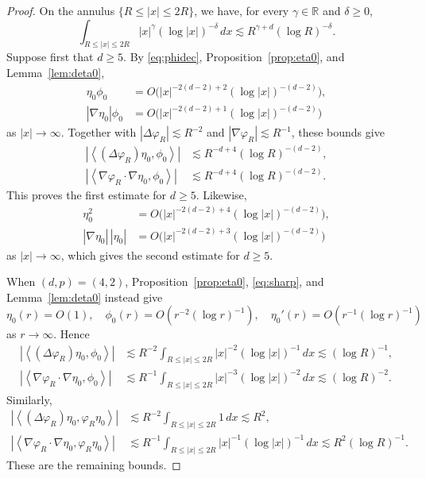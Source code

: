 \documentclass[12pt, a4paper, reqno]{amsart}
\numberwithin{equation}{section}
\theoremstyle{definition}
\theoremstyle{remark}
\newcommand{\R}{\mathbb R}
\def\tbra[#1,#2]{{\left\langle #1,#2\right\rangle}}
\def\abs[#1]{{\left\vert #1 \right\vert}}
\begin{document}
\begin{proof}
On the annulus $\{R\le|x|\le2R\}$, we have, for every
$\gamma\in\R$ and $\delta\ge0$,
\[
  \int_{R\le|x|\le2R}
  |x|^\gamma(\log|x|)^{-\delta}\,dx
  \lesssim R^{\gamma+d}(\log R)^{-\delta}.
\]
Suppose first that $d\ge5$. By \eqref{eq:phidec},
Proposition~\ref{prop:eta0}, and Lemma~\ref{lem:deta0},
\begin{align*}
  \eta_0\phi_0
  &=O\bigl(|x|^{-2(d-2)+2}(\log|x|)^{-(d-2)}\bigr),
  \\
  |\nabla\eta_0|\phi_0
  &=O\bigl(|x|^{-2(d-2)+1}(\log|x|)^{-(d-2)}\bigr)
\end{align*}
as $|x|\to\infty$. Together with
$|\Delta\varphi_R|\lesssim R^{-2}$ and
$|\nabla\varphi_R|\lesssim R^{-1}$, these bounds give
\begin{align*}
  \abs[{\tbra[(\Delta\varphi_R)\eta_0,\phi_0]}]
  &\lesssim R^{-d+4}(\log R)^{-(d-2)},
  \\
  \abs[{\tbra[\nabla\varphi_R\cdot\nabla\eta_0,\phi_0]}]
  &\lesssim R^{-d+4}(\log R)^{-(d-2)}.
\end{align*}
This proves the first estimate for $d\ge5$. Likewise,
\begin{align*}
  \eta_0^2
  &=O\bigl(|x|^{-2(d-2)+4}(\log|x|)^{-(d-2)}\bigr),
  \\
  |\nabla\eta_0|\,|\eta_0|
  &=O\bigl(|x|^{-2(d-2)+3}(\log|x|)^{-(d-2)}\bigr)
\end{align*}
as $|x|\to\infty$, which gives the second estimate for $d\ge5$.

When $(d,p)=(4,2)$, Proposition~\ref{prop:eta0},
\eqref{eq:sharp}, and Lemma~\ref{lem:deta0} instead give
\[
  \eta_0(r)=O(1),\quad
  \phi_0(r)=O(r^{-2}(\log r)^{-1}),\quad
  \eta_0'(r)=O(r^{-1}(\log r)^{-1})
\]
as $r\to\infty$. Hence
\begin{align*}
  \abs[{\tbra[(\Delta\varphi_R)\eta_0,\phi_0]}]
  &\lesssim R^{-2}
       \int_{R\le|x|\le2R}|x|^{-2}(\log|x|)^{-1}\,dx
       \lesssim(\log R)^{-1},\\
  \abs[{\tbra[\nabla\varphi_R\cdot\nabla\eta_0,\phi_0]}]
  &\lesssim R^{-1}
       \int_{R\le|x|\le2R}|x|^{-3}(\log|x|)^{-2}\,dx
       \lesssim(\log R)^{-2}.
\end{align*}
Similarly,
\begin{align*}
  \abs[{\tbra[(\Delta\varphi_R)\eta_0,\varphi_R\eta_0]}]
  &\lesssim R^{-2}\int_{R\le|x|\le2R}1\,dx
       \lesssim R^2,\\
  \abs[{\tbra[\nabla\varphi_R\cdot\nabla\eta_0,
                  \varphi_R\eta_0]}]
  &\lesssim R^{-1}
       \int_{R\le|x|\le2R}|x|^{-1}(\log|x|)^{-1}\,dx
       \lesssim R^2(\log R)^{-1}.
\end{align*}
These are the remaining bounds.
\end{proof}
\end{document}
